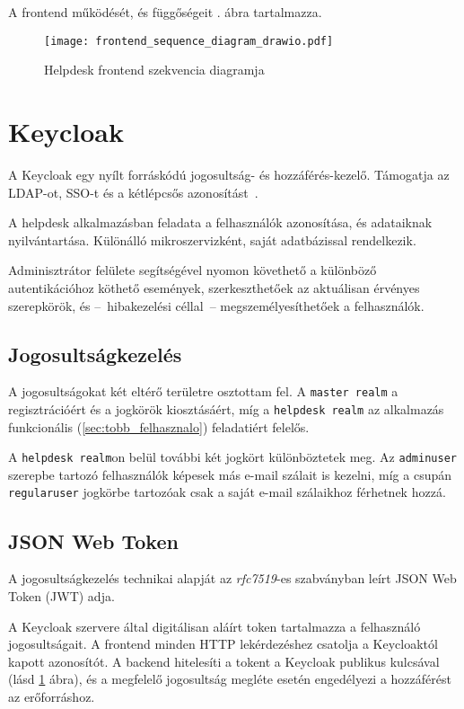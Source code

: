 A frontend működését, és függőségeit . ábra tartalmazza.

\begin{figure}[hbp] 
	\centering
	\texttt{[image: frontend\_sequence\_diagram\_drawio.pdf]}
	\caption{Helpdesk frontend szekvencia diagramja}
	\label{fig:frontend_sequence_diagram}
\end{figure}


\section{Keycloak}\label{sec:keycloak}
A Keycloak egy nyílt forráskódú jogosultság- és hozzáférés-kezelő. Támogatja az LDAP-ot, SSO-t és a kétlépcsős azonosítást~\cite{Keycloak_website}. 

A helpdesk alkalmazásban feladata a felhasználók azonosítása, és adataiknak nyilvántartása. Különálló mikroszervizként, saját adatbázissal rendelkezik.

Adminisztrátor felülete segítségével nyomon követhető a különböző autentikációhoz köthető események, szerkeszthetőek az aktuálisan érvényes szerepkörök, és --~hibakezelési céllal~-- megszemélyesíthetőek a felhasználók.


\subsection{Jogosultságkezelés}\label{sec:Jogosultságkezelés}
A jogosultságokat két eltérő területre osztottam fel. A \texttt{master realm} a regisztrációért és a jogkörök kiosztásáért, míg a \texttt{helpdesk realm} az alkalmazás funkcionális (\ref{sec:tobb_felhasznalo}) feladatiért felelős.

A \texttt{helpdesk realm}on belül további két jogkört különböztetek meg. Az \texttt{admin\textunderscore user} szerepbe tartozó felhasználók képesek más e-mail szálait is kezelni, míg a csupán \texttt{regular\textunderscore user} jogkörbe tartozóak csak a saját e-mail szálaikhoz férhetnek hozzá.


\subsection{JSON Web Token}\label{sec:JWT}
A jogosultságkezelés technikai alapját az \emph{rfc7519}-es szabványban \cite{rfc7519_JSON_Web_Token} leírt JSON Web Token (JWT) adja. 

A Keycloak szervere által digitálisan aláírt token tartalmazza a felhasználó jogosultságait. A frontend minden HTTP lekérdezéshez csatolja a Keycloaktól kapott azonosítót. A backend hitelesíti a tokent a Keycloak publikus kulcsával (lásd \ref{fig:frontend_sequence_diagram} ábra), és a megfelelő jogosultság megléte esetén engedélyezi a hozzáférést az erőforráshoz.


